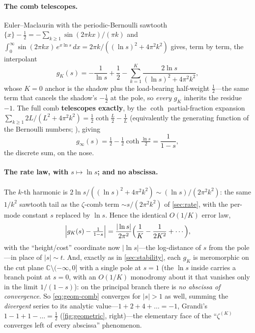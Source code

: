 \documentclass[11pt]{article}
\theoremstyle{definition}
\begin{document}
\paragraph{The comb telescopes.}
Euler--Maclaurin with the periodic-Bernoulli sawtooth
$\{x\}-\tfrac12=-\sum_{k\ge1}\sin(2\pi kx)/(\pi k)$ and
$\int_0^{\infty}\sin(2\pi kx)\,e^{x\ln s}\,dx=2\pi k/((\ln s)^2+4\pi^2k^2)$ gives, term
by term, the interpolant
\begin{equation}\label{eq:geom-comb}
  g_K(s)=-\frac{1}{\ln s}+\frac12
          -\sum_{k=1}^{K}\frac{2\ln s}{(\ln s)^2+4\pi^2k^2},
\end{equation}
whose $K=0$ anchor is the shadow plus the load-bearing half-weight $\tfrac12$---the
same term that cancels the shadow's $-\tfrac12$ at the pole, so \emph{every} $g_K$
inherits the residue $-1$. The full comb \textbf{telescopes exactly}, by the $\coth$
partial-fraction expansion
$\sum_{k\ge1}2L/(L^{2}+4\pi^2k^2)=\tfrac12\coth\tfrac L2-\tfrac1L$ (equivalently the
generating function of the Bernoulli numbers; \citealp{DLMF}), giving
\begin{equation}\label{eq:geom-telescope}
  g_\infty(s)=\tfrac12-\tfrac12\coth\!\tfrac{\ln s}{2}=\frac{1}{1-s},
\end{equation}
the discrete sum, on the nose.

\paragraph{The rate law, with $s\mapsto\ln s$; and no abscissa.}
The $k$-th harmonic is $2\ln s/((\ln s)^2+4\pi^2k^2)\sim(\ln s)/(2\pi^2k^2)$: the same
$1/k^{2}$ sawtooth tail as the $\zeta$-comb term $\sim s/(2\pi^2k^2)$ of
\cref{sec:rate}, with the per-mode constant $s$ replaced by $\ln s$. Hence the identical
$O(1/K)$ error law,
\begin{equation}\label{eq:geom-rate}
  \Bigl|g_K(s)-\tfrac{1}{1-s}\Bigr|
   =\frac{|\ln s|}{2\pi^2}\Bigl(\frac1K-\frac{1}{2K^2}+\cdots\Bigr),
\end{equation}
with the ``height/cost'' coordinate now $|\ln s|$---the log-distance of $s$ from the
pole---in place of $|s|\sim t$. And, exactly as in \cref{sec:stability}, each $g_K$ is
meromorphic on the cut plane $\mathbb{C}\setminus(-\infty,0]$ with a single pole at
$s=1$ (the $\ln s$ inside carries a branch point at $s=0$, with an $O(1/K)$ monodromy
about it that vanishes only in the limit $1/(1-s)$): on the principal branch there is
\emph{no abscissa of convergence}. So \eqref{eq:geom-comb} converges for $|s|>1$ as well,
summing the \emph{divergent} series to its analytic value---$1+2+4+\dots=-1$, Grandi's
$1-1+1-\dots=\tfrac12$ (\cref{fig:geometric}, right)---the elementary face of the
``$\zeta^{(K)}$ converges left of every abscissa'' phenomenon.
\end{document}
